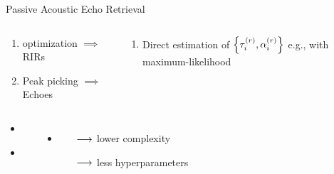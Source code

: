 \begin{frame}[t]{\alert{Passive} Acoustic Echo Retrieval \hfill\faBook}
        \pause[1]
        \vspace{.5em}
        \begin{columns}[T,onlytextwidth] %
            \begin{column}{.48\textwidth}
                \small
                \begin{enumerate}
                    \item {} optimization $\implies$ RIRs
                    \item Peak picking $\implies$ Echoes
                \end{enumerate}
            \end{column}
            \begin{column}{.48\textwidth}
                \small
                \begin{enumerate}
                    \item Direct estimation of $\set{\tauir, \ampir}$
                    e.g., with maximum-likelihood
                \end{enumerate}
            \end{column}%
        \end{columns}

        \pause[3]
        \vspace{1em}
        \begin{columns}[T,onlytextwidth] %
                \small
                \begin{itemize}
                    \item<3->[\cmark] 
                    \item<3->[\cmark] 
                    \\{\scriptsize~\cite{crocco2016estimation}}
                \end{itemize}
                \small
                \begin{itemize}
                    \item<5->[\cmark] 
                    \begin{itemize}\footnotesize
                        \item[$\longrightarrow$] lower complexity
                        \item[$\longrightarrow$] less hyperparameters
                    \end{itemize}
                    \end{itemize}
        \end{columns}


\end{frame}
